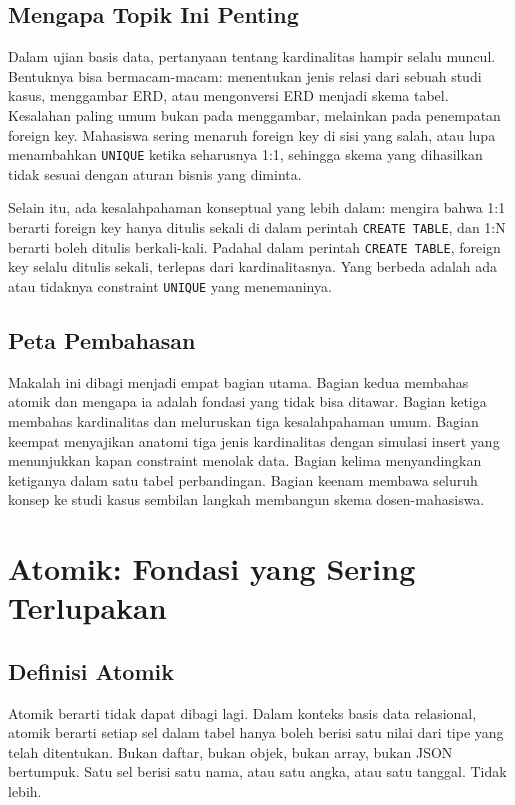 \documentclass[11pt,a4paper]{article}
\begin{document}
\subsection{Mengapa Topik Ini Penting}

Dalam ujian basis data, pertanyaan tentang kardinalitas hampir selalu muncul. Bentuknya bisa bermacam-macam: menentukan jenis relasi dari sebuah studi kasus, menggambar ERD, atau mengonversi ERD menjadi skema tabel. Kesalahan paling umum bukan pada menggambar, melainkan pada penempatan foreign key. Mahasiswa sering menaruh foreign key di sisi yang salah, atau lupa menambahkan \texttt{UNIQUE} ketika seharusnya 1:1, sehingga skema yang dihasilkan tidak sesuai dengan aturan bisnis yang diminta.

Selain itu, ada kesalahpahaman konseptual yang lebih dalam: mengira bahwa 1:1 berarti foreign key hanya ditulis sekali di dalam perintah \texttt{CREATE TABLE}, dan 1:N berarti boleh ditulis berkali-kali. Padahal dalam perintah \texttt{CREATE TABLE}, foreign key selalu ditulis sekali, terlepas dari kardinalitasnya. Yang berbeda adalah ada atau tidaknya constraint \texttt{UNIQUE} yang menemaninya.

\subsection{Peta Pembahasan}

Makalah ini dibagi menjadi empat bagian utama. Bagian kedua membahas atomik dan mengapa ia adalah fondasi yang tidak bisa ditawar. Bagian ketiga membahas kardinalitas dan meluruskan tiga kesalahpahaman umum. Bagian keempat menyajikan anatomi tiga jenis kardinalitas dengan simulasi insert yang menunjukkan kapan constraint menolak data. Bagian kelima menyandingkan ketiganya dalam satu tabel perbandingan. Bagian keenam membawa seluruh konsep ke studi kasus sembilan langkah membangun skema dosen-mahasiswa.

\section{Atomik: Fondasi yang Sering Terlupakan}

\subsection{Definisi Atomik}

Atomik berarti tidak dapat dibagi lagi. Dalam konteks basis data relasional, atomik berarti setiap sel dalam tabel hanya boleh berisi satu nilai dari tipe yang telah ditentukan. Bukan daftar, bukan objek, bukan array, bukan JSON bertumpuk. Satu sel berisi satu nama, atau satu angka, atau satu tanggal. Tidak lebih.
\end{document}
